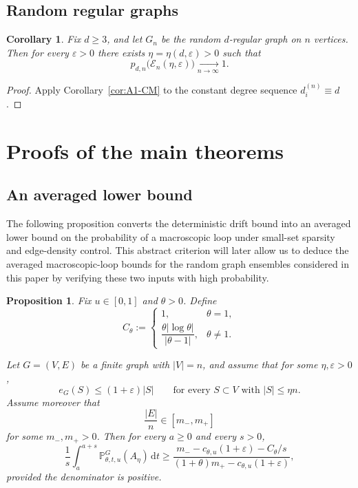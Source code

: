 \documentclass[11pt]{article}
\newtheorem{proposition}[theorem]{Proposition}
\newtheorem{corollary}[theorem]{Corollary}
\theoremstyle{remark}
\theoremstyle{plain}
\newcommand{\Pbb}{\mathbb{P}}
\newcommand{\1}{\mathbbm{1}}
\newcommand{\dd}{\mathrm{d}}
\begin{document}
\subsection{Random regular graphs}

\begin{corollary}
\label{cor:A1-RRG}
Fix \(d\ge 3\), and let \(G_n\) be the random \(d\)-regular graph on \(n\) vertices. Then for every \(\varepsilon>0\) there exists \(\eta=\eta(d,\varepsilon)>0\) such that
\[
p_{d,n}\bigl(\mathcal E_n(\eta,\varepsilon)\bigr)\xrightarrow[n\to\infty]{}1.
\]
\end{corollary}

\begin{proof}
Apply Corollary~\ref{cor:A1-CM} to the constant degree sequence \(d_i^{(n)}\equiv d\).
\end{proof}



\section{Proofs of the main theorems}

\subsection{An averaged lower bound}
The following proposition converts the deterministic drift bound into an averaged lower bound on the probability of a macroscopic loop under small-set sparsity and edge-density control. This abstract criterion will later allow us to deduce the averaged macroscopic-loop bounds for the random graph ensembles considered in this paper by verifying these two inputs with high probability.
\begin{proposition}
\label{prop:abstract-averaged}
Fix \(u\in[0,1]\) and \(\theta>0\). Define
\[
C_\theta:=
\begin{cases}
1, & \theta=1,\\[1ex]
\dfrac{\theta |\log \theta|}{|\theta-1|}, & \theta\neq 1.
\end{cases}
\]

Let \(G=(V,E)\) be a finite graph with \(|V|=n\), and assume that for some \(\eta,\varepsilon>0\),
\[
e_G(S)\le (1+\varepsilon)|S|
\qquad\text{for every }S\subset V\text{ with }|S|\le \eta n.
\]
Assume moreover that
\[
\frac{|E|}{n}\in [m_-,m_+]
\]
for some \(m_-,m_+>0\).
Then for every \(a\ge 0\) and every \(s>0\),
\[
\frac1s\int_a^{a+s}\Pbb^G_{\theta,t,u}(A_\eta)\,\dd t
\ge
\frac{
m_- - c_{\theta,u}(1+\varepsilon)-C_\theta/s
}{
(1+\theta)m_+ - c_{\theta,u}(1+\varepsilon)
},
\]
provided the denominator is positive.
\end{proposition}
\end{document}
